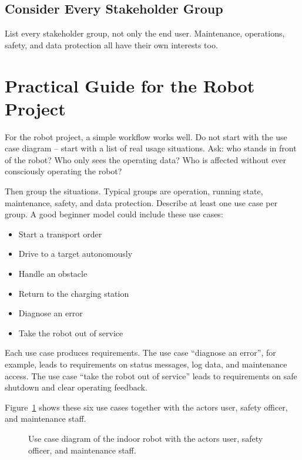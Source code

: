 \subsection{Consider Every Stakeholder Group}
List every stakeholder group, not only the end user. Maintenance, operations, safety, and data protection all have their own interests too.

\section{Practical Guide for the Robot Project}
For the robot project, a simple workflow works well. Do not start with the use case diagram -- start with a list of real usage situations. Ask: who stands in front of the robot? Who only sees the operating data? Who is affected without ever consciously operating the robot?

Then group the situations. Typical groups are operation, running state, maintenance, safety, and data protection. Describe at least one use case per group. A good beginner model could include these use cases:

\begin{itemize}
    \item Start a transport order
    \item Drive to a target autonomously
    \item Handle an obstacle
    \item Return to the charging station
    \item Diagnose an error
    \item Take the robot out of service
\end{itemize}

Each use case produces requirements. The use case \enquote{diagnose an error}, for example, leads to requirements on status messages, log data, and maintenance access. The use case \enquote{take the robot out of service} leads to requirements on safe shutdown and clear operating feedback.

Figure~\ref{fig:kap07-usecase-diagramm} shows these six use cases together with the actors user, safety officer, and maintenance staff.

\begin{figure}[H]
  \centering
  \caption{Use case diagram of the indoor robot with the actors user, safety officer, and maintenance staff.}
  \label{fig:kap07-usecase-diagramm}
\end{figure}

